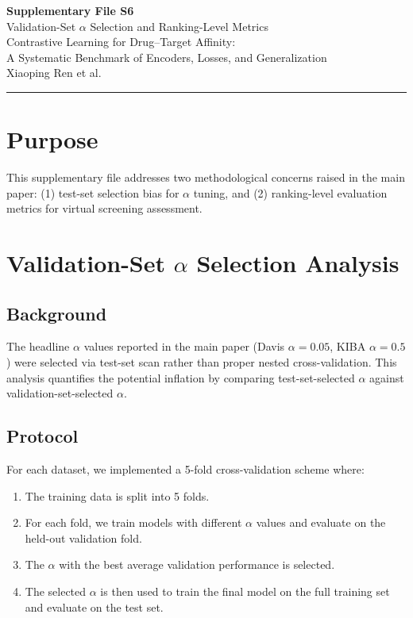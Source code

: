 \documentclass[10pt,a4paper]{article}
\begin{document}
\begin{center}
{\Large\bfseries Supplementary File S6}\\[0.5em]
{\large Validation-Set $\alpha$ Selection and Ranking-Level Metrics}\\[1em]
Contrastive Learning for Drug--Target Affinity:\\A Systematic Benchmark of Encoders, Losses, and Generalization\\[0.5em]
Xiaoping Ren et al.
\end{center}

\noindent\rule{\linewidth}{1pt}
\vspace{1em}

\section{Purpose}

This supplementary file addresses two methodological concerns raised in the main paper: (1) test-set selection bias for $\alpha$ tuning, and (2) ranking-level evaluation metrics for virtual screening assessment.

\section{Validation-Set $\alpha$ Selection Analysis}

\subsection{Background}

The headline $\alpha$ values reported in the main paper (Davis $\alpha=0.05$, KIBA $\alpha=0.5$) were selected via test-set scan rather than proper nested cross-validation. This analysis quantifies the potential inflation by comparing test-set-selected $\alpha$ against validation-set-selected $\alpha$.

\subsection{Protocol}

For each dataset, we implemented a 5-fold cross-validation scheme where:
\begin{enumerate}
\item The training data is split into 5 folds.
\item For each fold, we train models with different $\alpha$ values and evaluate on the held-out validation fold.
\item The $\alpha$ with the best average validation performance is selected.
\item The selected $\alpha$ is then used to train the final model on the full training set and evaluate on the test set.
\end{enumerate}
\end{document}
